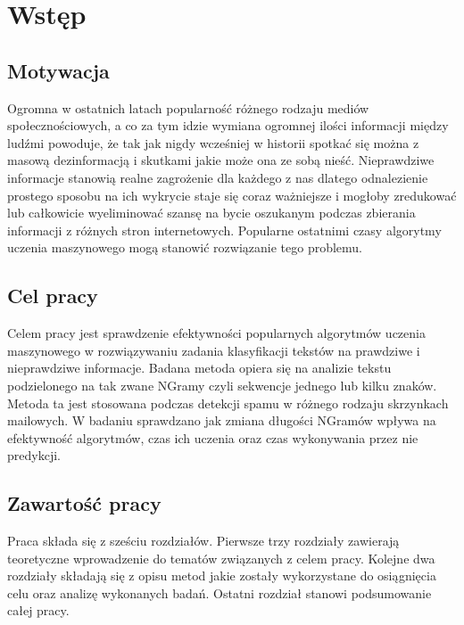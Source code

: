 \chapter*{Wstęp}
\section*{Motywacja}
Ogromna w ostatnich latach popularność różnego rodzaju mediów społecznościowych, a co za tym 
idzie wymiana ogromnej ilości informacji między ludźmi powoduje, że tak jak nigdy wcześniej 
w historii spotkać się można z masową dezinformacją i skutkami jakie może ona ze sobą nieść.
Nieprawdziwe informacje stanowią realne zagrożenie dla każdego z nas dlatego odnalezienie 
prostego sposobu na ich wykrycie staje się coraz ważniejsze i mogłoby 
zredukować lub całkowicie wyeliminować szansę na bycie oszukanym podczas zbierania
informacji z różnych stron internetowych. Popularne ostatnimi czasy algorytmy uczenia 
maszynowego mogą stanowić rozwiązanie tego problemu.
\section*{Cel pracy}
Celem pracy jest sprawdzenie efektywności popularnych algorytmów uczenia maszynowego w rozwiązywaniu 
zadania klasyfikacji tekstów na prawdziwe i nieprawdziwe informacje. Badana metoda opiera 
się na analizie tekstu podzielonego na tak zwane NGramy czyli sekwencje jednego lub kilku znaków.
Metoda ta jest stosowana podczas detekcji spamu w różnego rodzaju skrzynkach mailowych.
W badaniu sprawdzano jak zmiana długości NGramów wpływa na efektywność algorytmów, czas ich 
uczenia oraz czas wykonywania przez nie predykcji. 
\section*{Zawartość pracy}
Praca składa się z sześciu rozdziałów. Pierwsze trzy rozdziały zawierają teoretyczne wprowadzenie 
do tematów związanych z celem pracy. Kolejne dwa rozdziały składają się z opisu metod jakie 
zostały wykorzystane do osiągnięcia celu oraz analizę wykonanych badań. Ostatni rozdział 
stanowi podsumowanie całej pracy.


